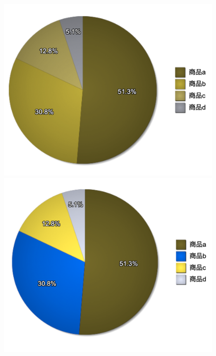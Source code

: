 \begin{figure}[H]
\begin{minipage}[b]{.49\columnwidth}
    \end{minipage}
    \begin{minipage}[b]{.49\columnwidth}
        \centering
        \includegraphics[keepaspectratio,width=\textwidth]{../../10_UniversalDesign/no2_circle_CC_P.png}
    \end{minipage}
    \begin{minipage}[b]{.49\columnwidth}
        \centering
        \includegraphics[keepaspectratio,width=\textwidth]{../../10_UniversalDesign/no2_circle_RC_P.png}

\end{minipage}
\end{figure}
